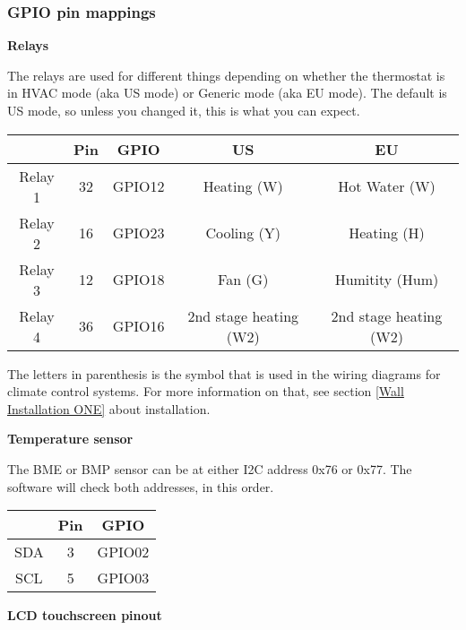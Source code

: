 \subsubsection{GPIO pin mappings} \label{GPIO pin mappings}

\textbf{Relays}

The relays are used for different things depending on whether the thermostat is
in HVAC mode (aka US mode) or Generic mode (aka EU mode). The default is US
mode, so unless you changed it, this is what you can expect.

\begin{tabular}{|c|c|c|c|c|}
\rowcolor{lightgray}
\hline
         & \textbf{Pin} & \textbf{GPIO} & US & EU \\
\hline
Relay 1 & 32           & GPIO12 & Heating (W) & Hot Water (W) \\
\hline
Relay 2 & 16           & GPIO23 & Cooling (Y) & Heating (H) \\
\hline
Relay 3 & 12           & GPIO18 & Fan (G) & Humitity (Hum) \\
\hline
Relay 4 & 36           & GPIO16 & 2nd stage heating (W2) & 2nd stage heating (W2) \\
\hline
\end{tabular}

The letters in parenthesis is the symbol that is used in the wiring diagrams
for climate control systems. For more information on that, see section
\ref{Wall Installation ONE} about installation.

\textbf{Temperature sensor}

The BME or BMP sensor can be at either I2C address 0x76 or 0x77. The software
will check both addresses, in this order.

\begin{tabular}{|c|c|c|}
\rowcolor{lightgray}
\hline
     & \textbf{Pin} & \textbf{GPIO} \\
\hline
 SDA & 3            & GPIO02 \\
\hline
 SCL & 5            & GPIO03 \\ 
\hline
\end{tabular}

\textbf{LCD touchscreen pinout}

